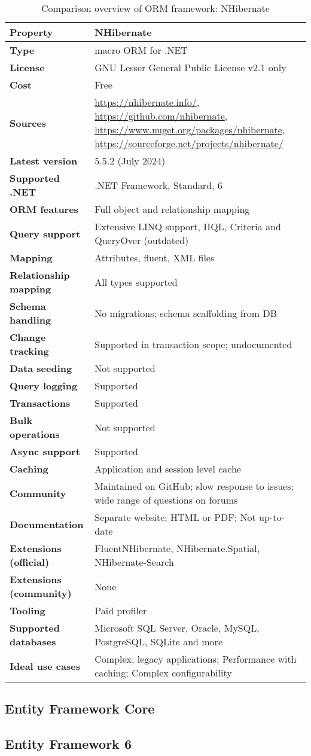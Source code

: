 \begin{table}[H]
\centering
\caption{Comparison overview of ORM framework: NHibernate}
\begin{tabular}{|l|l|}
\toprule
\textbf{Property} & \textbf{NHibernate} \\
\midrule
\textbf{Type} & macro ORM for .NET \\
\textbf{License} & GNU Lesser General Public License v2.1 only \\
\textbf{Cost} & Free \\
\textbf{Sources} & \url{https://nhibernate.info/}, \url{https://github.com/nhibernate}, \url{https://www.nuget.org/packages/nhibernate}, \url{https://sourceforge.net/projects/nhibernate/}  \\
\textbf{Latest version} & 5.5.2 (July 2024) \\
\textbf{Supported .NET} & .NET Framework, Standard, 6 \\
\textbf{ORM features} & Full object and relationship mapping \\
\textbf{Query support} & Extensive LINQ support, HQL, Criteria and QueryOver (outdated) \\
\textbf{Mapping} & Attributes, fluent, XML files \\
\textbf{Relationship mapping} & All types supported \\
\textbf{Schema handling} & No migrations; schema scaffolding from DB \\
\textbf{Change tracking} & Supported in transaction scope; undocumented \\
\textbf{Data seeding} & Not supported \\
\textbf{Query logging} & Supported \\
\textbf{Transactions} & Supported \\
\textbf{Bulk operations} & Not supported \\
\textbf{Async support} & Supported \\
\textbf{Caching} & Application and session level cache \\
\textbf{Community} & Maintained on GitHub; slow response to issues; wide range of questions on forums \\
\textbf{Documentation} & Separate website; HTML or PDF; Not up-to-date\\
\textbf{Extensions (official)} & FluentNHibernate, NHibernate.Spatial, NHibernate-Search  \\
\textbf{Extensions (community)} & None \\
\textbf{Tooling} & Paid profiler \\
\textbf{Supported databases} & Microsoft SQL Server, Oracle, MySQL, PostgreSQL, SQLite and more  \\
\textbf{Ideal use cases} & Complex, legacy applications; Performance with caching; Complex configurability \\
\bottomrule
\end{tabular}
\end{table}

\subsection{Entity Framework Core}

\subsection{Entity Framework 6}